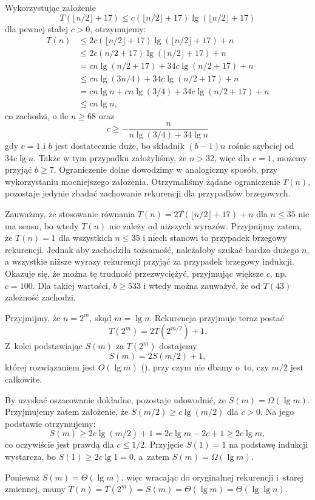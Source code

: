 \exercise %
Wykorzystując założenie
\[
	T(\lfloor n/2\rfloor+17) \le c(\lfloor n/2\rfloor+17)\lg(\lfloor n/2\rfloor+17)
\]
dla pewnej stałej $c>0$, otrzymujemy:
\begin{align*}
	T(n) &\le 2c(\lfloor n/2\rfloor+17)\lg(\lfloor n/2\rfloor+17)+n \\
	&\le 2c(n/2+17)\lg(\lfloor n/2\rfloor+17)+n \\
	&= cn\lg(n/2+17)+34c\lg(n/2+17)+n \\
	&\le cn\lg(3n/4)+34c\lg(n/2+17)+n \\
	&= cn\lg n+cn\lg(3/4)+34c\lg(n/2+17)+n \\
	&\le cn\lg n,
\end{align*}
co zachodzi, o ile $n\ge68$ oraz
\[
    c \ge -\frac{n}{n\lg(3/4)+34\lg n}
\]
gdy $c=1$ i $b$ jest dostatecznie duże, bo składnik $(b-1)n$ rośnie szybciej od $34c\lg n$. Także w tym przypadku założyliśmy, że $n>32$, więc dla $c=1$, możemy przyjąć $b\ge7$. Ograniczenie dolne dowodzimy w analogiczny sposób, przy wykorzystaniu mocniejszego założenia. Otrzymaliśmy żądane ograniczenie $T(n)$, pozostaje jedynie zbadać zachowanie rekurencji dla przypadków brzegowych.

Zauważmy, że stosowanie równania $T(n)=2T(\lfloor n/2\rfloor+17)+n$ dla $n\le35$ nie ma sensu, bo wtedy $T(n)$ nie zależy od niższych wyrazów. Przyjmijmy zatem, że $T(n)=1$ dla wszystkich $n\le35$ i niech stanowi to przypadek brzegowy rekurencji. Jednak aby zachodziła tożsamość, należałoby szukać bardzo dużego $n$, a wszystkie niższe wyrazy rekurencji przyjąć za przypadek brzegowy indukcji. Okazuje się, że można tę trudność przezwyciężyć, przyjmując większe $c$, np.\ $c=100$. Dla takiej wartości, $b\ge533$ i wtedy można zauważyć, że od $T(43)$ zależność zachodzi.

\exercise %
Przyjmijmy, że $n=2^m$, skąd $m=\lg n$. Rekurencja przyjmuje teraz postać
\[
	T(2^m) = 2T(2^{m/2})+1.
\]
Z~kolei podstawiając $S(m)$ za $T(2^m)$ dostajemy
\[
	S(m) = 2S(m/2)+1,
\]
której rozwiązaniem jest $O(\lg m)$ (), przy czym nie dbamy o~to, czy $m/2$ jest całkowite.

By uzyskać oszacowanie dokładne, pozostaje udowodnić, że $S(m)=\Omega(\lg m)$. Przyjmujemy zatem założenie, że $S(m/2)\ge c\lg(m/2)$ dla $c>0$. Na jego podstawie otrzymujemy:
\[
	S(m) \ge 2c\lg(m/2)+1 = 2c\lg m-2c+1 \ge 2c\lg m,
\]
co oczywiście jest prawdą dla $c\le1/2$. Przyjęcie $S(1)=1$ na podstawę indukcji wystarcza, bo $S(1)\ge2c\lg1=0$, a~zatem $S(m)=\Omega(\lg m)$.

Ponieważ $S(m)=\Theta(\lg m)$, więc wracając do oryginalnej rekurencji i~starej zmiennej, mamy $T(n)=T(2^m)=S(m)=\Theta(\lg m)=\Theta(\lg\lg n)$.

